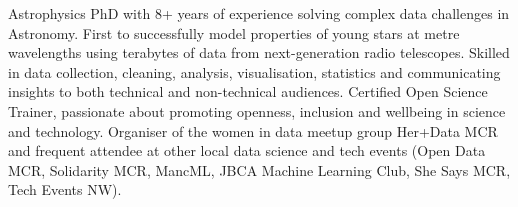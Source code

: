  \vspace{-6pt}

\begin{cvpubs}
  \cvpub
    {
      \begin{cvlist}
  \item {Astrophysics PhD with 8+ years of experience solving complex data challenges in Astronomy. First to successfully model properties of young stars at metre wavelengths using terabytes of data from next-generation radio telescopes. Skilled in data collection, cleaning, analysis, visualisation, statistics and communicating insights to both technical and non-technical audiences. Certified Open Science Trainer, passionate about promoting openness, inclusion and wellbeing in science and technology. Organiser of the women in data meetup group Her+Data MCR and frequent attendee at other local data science and tech events (Open Data MCR, Solidarity MCR, MancML, JBCA Machine Learning Club, She Says MCR, Tech Events NW).}
      \end{cvlist}
    }
\vspace{-11pt}
\end{cvpubs}

